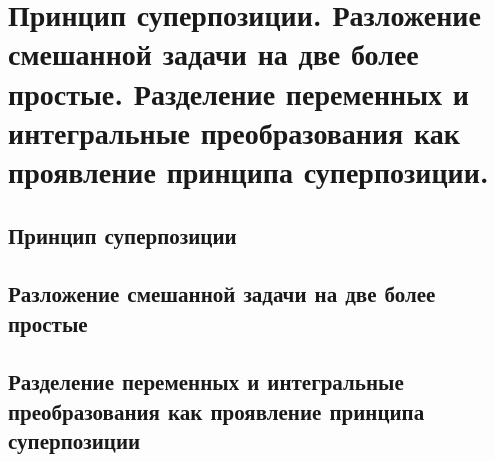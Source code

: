 \chapter{Принцип суперпозиции. Разложение смешанной задачи на две более
простые. Разделение переменных и интегральные преобразования как проявление
принципа суперпозиции.}

\section{Принцип суперпозиции}
\section{Разложение смешанной задачи на две более простые}
\section{Разделение переменных и интегральные преобразования как проявление 
принципа суперпозиции}

\newpage
